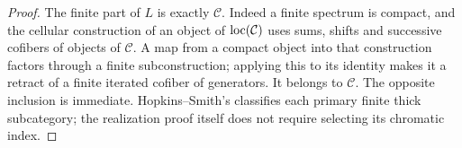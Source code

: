 \begin{proof}
The finite part of $L$ is exactly $\mathcal C$. Indeed a finite spectrum is compact, and the cellular construction of an object of $\operatorname{loc}(\mathcal C)$ uses sums, shifts and successive cofibers of objects of $\mathcal C$. A map from a compact object into that construction factors through a finite subconstruction; applying this to its identity makes it a retract of a finite iterated cofiber of generators. It belongs to $\mathcal C$. The opposite inclusion is immediate. Hopkins--Smith's \cite[Theorem~7]{AHopkinsSmith} classifies each primary finite thick subcategory; the realization proof itself does not require selecting its chromatic index.
\end{proof}

